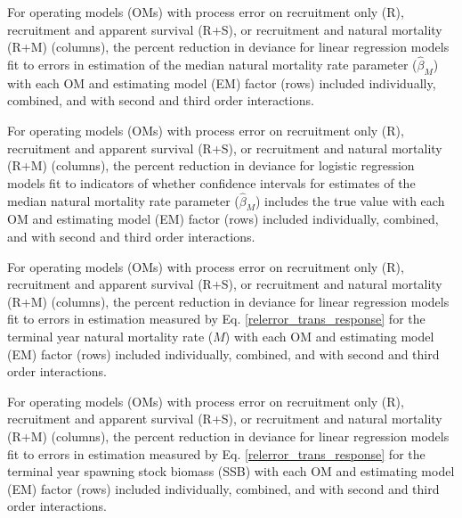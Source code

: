 \documentclass[
  12pt,
]{article}
\begin{document}
\begin{table}
\caption{For operating models (OMs) with process error on recruitment only (R), recruitment and apparent survival (R+S), or recruitment and natural mortality (R+M) (columns), the percent reduction in deviance for linear regression models fit to errors in estimation of the median natural mortality rate parameter ($\widehat \beta_M$) with each OM and estimating model (EM) factor (rows) included individually, combined, and with second and third order interactions.}\label{bias_median_M_converged_PRD_table}
{}
\end{table}
\pagebreak

\begin{table}
\caption{For operating models (OMs) with process error on recruitment only (R), recruitment and apparent survival (R+S), or recruitment and natural mortality (R+M) (columns), the percent reduction in deviance for logistic regression models fit to indicators of whether confidence intervals for estimates of the median natural mortality rate parameter ($\widehat \beta_M$) includes the true value with each OM and estimating model (EM) factor (rows) included individually, combined, and with second and third order interactions.}\label{mean_M_ci_coverage_PRD_table}
{}
\end{table}
\pagebreak

\begin{table}
\caption{For operating models (OMs) with process error on recruitment only (R), recruitment and apparent survival (R+S), or recruitment and natural mortality (R+M) (columns), the percent reduction in deviance for linear regression models fit to errors in estimation measured by Eq. \ref{relerror_trans_response} for the terminal year natural mortality rate ($M$) with each OM and estimating model (EM) factor (rows) included individually, combined, and with second and third order interactions.}\label{bias_M_PRD_table}
{}
\end{table}
\pagebreak

\begin{table}
\caption{For operating models (OMs) with process error on recruitment only (R), recruitment and apparent survival (R+S), or recruitment and natural mortality (R+M) (columns), the percent reduction in deviance for linear regression models fit to errors in estimation measured by Eq. \ref{relerror_trans_response} for the terminal year spawning stock biomass (SSB) with each OM and estimating model (EM) factor (rows) included individually, combined, and with second and third order interactions.}\label{bias_SSB_PRD_table}
{}
\end{table}
\pagebreak
\end{document}
